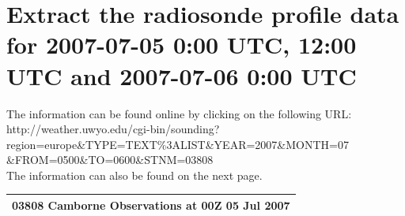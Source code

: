 \documentclass{article}
\begin{document}
\section{Extract the radiosonde profile data for 2007-07-05 0:00 UTC, 12:00 UTC and 2007-07-06 0:00 UTC}
The information can be found online by clicking on the following URL:\\
http://weather.uwyo.edu/cgi-bin/sounding?region=europe\&TYPE=TEXT\%3ALIST\&YEAR=2007\&MONTH=07\\
\&FROM=0500\&TO=0600\&STNM=03808\\

The information can also be found on the next page.
\newpage

\begin{longtable}{r|r|r|r|r|r|r|r|r|r|r}
\multicolumn{11}{c}{\textbf{03808 Camborne Observations at 00Z 05 Jul 2007}}\\ \hline


\end{longtable}
\end{document}
